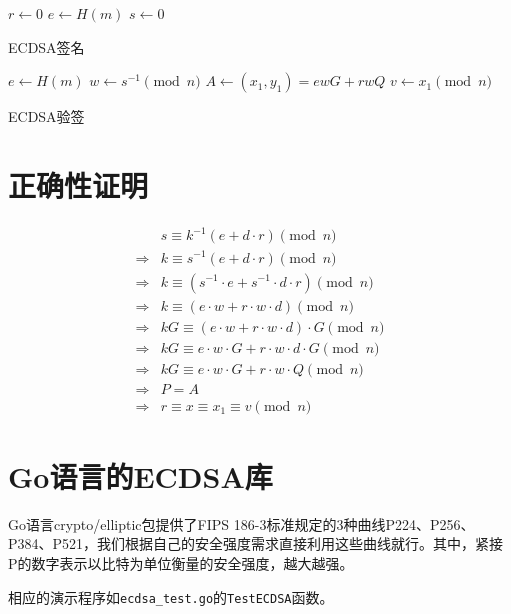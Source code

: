 \documentclass[a4paper,10pt]{article}
\begin{document}
\begin{adjustbox}{left=0.45\linewidth,minipage=0.45\linewidth,valign=T}
  \begin{algorithm}[H]
    \DontPrintSemicolon

    \BlankLine

    \(r\leftarrow 0\)\;
    \(e\leftarrow H(m)\)\;
    \(s\leftarrow 0\)\;

    \caption{ECDSA签名}\label{algo-sign}
  \end{algorithm}
\end{adjustbox}  
\begin{adjustbox}{left=0.45\linewidth,minipage=0.45\linewidth,valign=T}
  \begin{algorithm}[H]
    \DontPrintSemicolon

    \BlankLine

    \(e\leftarrow H(m)\)\;
    \(w\leftarrow s^{-1}\pmod{n}\)\;
    \(A\leftarrow (x_1,y_1)=ewG+rwQ\)\;
    \(v\leftarrow x_1\pmod{n}\)\;

    \caption{ECDSA验签}\label{algo-verify}
  \end{algorithm}
\end{adjustbox}  

\section{正确性证明}
\[
  \begin{aligned}  
    &s \equiv k^{-1}(e+d\cdot r)\pmod{n} \\
    \Rightarrow &k \equiv s^{-1}(e+d\cdot r)\pmod{n} \\
    \Rightarrow &k \equiv (s^{-1}\cdot e+s^{-1}\cdot d\cdot r)\pmod{n} \\
    \Rightarrow &k \equiv (e\cdot w+r\cdot w\cdot d)\pmod{n} \\
    \Rightarrow &kG \equiv (e\cdot w+r\cdot w\cdot d)\cdot G\pmod{n} \\
    \Rightarrow &kG \equiv e\cdot w\cdot G +r\cdot w\cdot d\cdot G \pmod{n} \\
    \Rightarrow &kG \equiv e\cdot w\cdot G +r\cdot w\cdot Q \pmod{n} \\
    \Rightarrow &P=A \\
    \Rightarrow &r\equiv x\equiv x_1\equiv v\pmod{n}
  \end{aligned}  
\]

\section{Go语言的ECDSA库}
Go语言crypto/elliptic包提供了FIPS 186-3标准规定的3种曲线P224、P256、P384、P521，我们根据自己的安全强度需求直接利用这些曲线就行。其中，紧接P的数字表示以比特为单位衡量的安全强度，越大越强。

相应的演示程序如\lstinline!ecdsa_test.go!的\lstinline!TestECDSA!函数。
\end{document}
